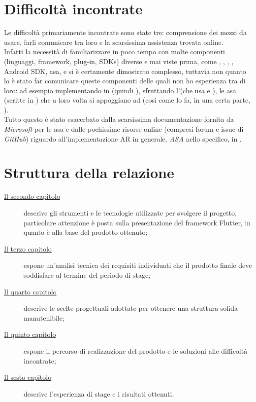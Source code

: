 \section{Difficoltà incontrate}
Le difficoltà primariamente incontrate sono state tre: comprensione dei mezzi da usare, farli comunicare tra loro e la scarsissima assistenza trovata online.\\
Infatti la necessità di familiarizzare in poco tempo con molte componenti (linguaggi, framework, plug-in, SDKs) diverse e mai viste prima, come \flutter, \kotlin, \java, \dart, Android SDK, asa, \arcore e \arplug si è certamente dimostrato complesso, tuttavia non quanto lo è stato far comunicare queste componenti delle quali non ho esperienza tra di loro: ad esempio implementando in \flutter (quindi \dart), sfruttando l'\arplug (che usa \kotlin e \flutter), le asa (scritte in \java) che a loro volta si appoggiano ad \arcore (così come lo fa, in una certa parte, \arplug). \\
Tutto questo è stato esacerbato dalla scarsissima documentazione fornita da \textit{Microsoft} per le asa e dalle pochissime risorse online (compresi forum e issue di \textit{GitHub}) riguardo all'implementazione AR in generale, \textit{ASA} nello specifico, in \flutter.
\section{Struttura della relazione}

\begin{description}
    \item[{\hyperref[cap:strumenti-utilizzati]{Il secondo capitolo}}] descrive gli strumenti e le tecnologie utilizzate per svolgere il progetto, particolare attenzione è posta sulla presentazione del framework Flutter, in quanto è alla base del prodotto ottenuto;
    
    \item[{\hyperref[cap:analisi-requisiti]{Il terzo capitolo}}] espone un'analisi tecnica dei requisiti individuati che il prodotto finale deve soddisfare al termine del periodo di stage;
    
    \item[{\hyperref[cap:progettazione]{Il quarto capitolo}}] descrive le scelte progettuali adottate per ottenere una struttura solida manutenibile;
    
    \item[{\hyperref[cap:sviluppo]{Il quinto capitolo}}] espone il percorso di realizzazione del prodotto e le soluzioni alle difficoltà incontrate;
    
    \item[{\hyperref[cap:conclusioni]{Il sesto capitolo}}] descrive l'esperienza di stage e i risultati ottenuti.
\end{description}

